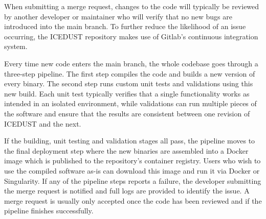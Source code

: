 When submitting a merge request, changes to the code will typically be reviewed by another developer or maintainer who will verify that no new bugs are introduced into the main branch. To further reduce the likelihood of an issue occurring, the ICEDUST repository makes use of Gitlab's continuous integration system.

Every time new code enters the main branch, the whole codebase goes through a three-step pipeline. The first step compiles the code and builds a new version of every binary. The second step runs custom unit tests and validations using this new build. Each unit test typically verifies that a single functionality works as intended in an isolated environment, while validations can run multiple pieces of the software and ensure that the results are consistent between one revision of ICEDUST and the next.

If the building, unit testing and validation stages all pass, the pipeline moves to the final deployment step where the new binaries are assembled into a Docker image which is published to the repository's container registry. Users who wish to use the compiled software as-is can download this image and run it via Docker or Singularity.
If any of the pipeline steps reports a failure, the developer submitting the merge request is notified and full logs are provided to identify the issue. A merge request is usually only accepted once the code has been reviewed and if the pipeline finishes successfully.

